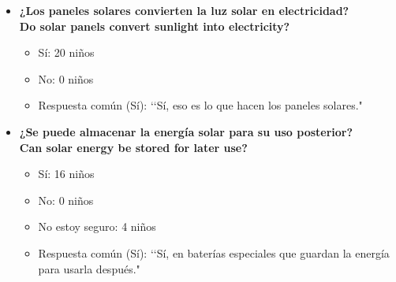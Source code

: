 \documentclass[12pt]{article}
\begin{document}
\begin{itemize}
      \item \textbf{¿Los paneles solares convierten la luz solar en electricidad?}\\
            \textbf{Do solar panels convert sunlight into electricity?}
            \begin{itemize}
                  \item Sí: 20 niños
                  \item No: 0 niños
                  \item Respuesta común (Sí): \lq\lq Sí, eso es lo que hacen los paneles solares."
            \end{itemize}
            \begin{minipage}{\linewidth}
                  \centering
                  \begin{minipage}{0.5\linewidth}
                  \end{minipage}%
            \end{minipage}

      \item \textbf{¿Se puede almacenar la energía solar para su uso posterior?}\\
            \textbf{Can solar energy be stored for later use?}
            \begin{itemize}
                  \item Sí: 16 niños
                  \item No: 0 niños
                  \item No estoy seguro: 4 niños
                  \item Respuesta común (Sí): \lq\lq Sí, en baterías especiales que guardan la energía para usarla después."
            \end{itemize}
            \begin{minipage}{\linewidth}
                  \centering
                  \begin{minipage}{0.5\linewidth}
                  \end{minipage}%
            \end{minipage}


\end{itemize}
\end{document}

